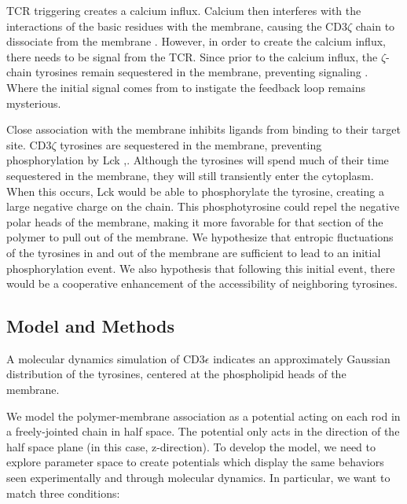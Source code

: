 \documentclass[../../AdvancementSummary.tex]{subfiles}
\begin{document}
TCR triggering creates a calcium influx. Calcium then interferes with the interactions of the basic residues with the membrane, causing the CD3$\zeta$ chain to dissociate from the membrane \cite{Shi2013}. However, in order to create the calcium influx, there needs to be signal from the TCR. 
Since prior to the calcium influx, the $\zeta$-chain tyrosines remain sequestered in the membrane, preventing signaling . Where the initial signal comes from to instigate the feedback loop remains mysterious.

Close association with the membrane inhibits ligands from binding to their target site. CD3$\zeta$ tyrosines are sequestered in the membrane, preventing phosphorylation by Lck \cite{Aivazian200},\cite{Shi2013}.  Although the tyrosines will spend much of their time sequestered in the membrane, they will still transiently enter the cytoplasm. When this occurs, Lck would be able to phosphorylate the tyrosine, creating a large negative charge on the chain. This phosphotyrosine could repel the negative polar heads of the membrane, making it more favorable for that section of the polymer to pull out of the membrane. We hypothesize that entropic fluctuations of the tyrosines in and out of the membrane are sufficient to lead to an initial phosphorylation event. We also hypothesis that following this initial event, there would be a cooperative enhancement of the accessibility of neighboring tyrosines.


\subsection{Model and Methods}


A molecular dynamics simulation of CD3$\epsilon$ indicates an approximately Gaussian distribution of the tyrosines, centered at the phospholipid heads of the membrane. \cite{Lopez2015}

We model the polymer-membrane association as a potential acting on each rod in a freely-jointed chain in half space. The potential only acts in the direction of the half space plane (in this case, z-direction). To develop the model, we need to explore parameter space to create potentials which display the same behaviors seen experimentally and through molecular dynamics. In particular, we want to match three conditions:
\end{document}
